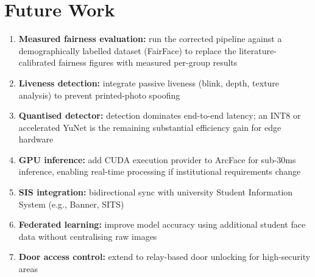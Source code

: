 \documentclass[12pt,a4paper]{report}
\begin{document}
\section{Future Work}
\begin{enumerate}
  \item \textbf{Measured fairness evaluation:} run the corrected pipeline against a
        demographically labelled dataset (FairFace) to replace the
        literature-calibrated fairness figures with measured per-group results
  \item \textbf{Liveness detection:} integrate passive liveness (blink, depth, texture analysis) to prevent printed-photo spoofing
  \item \textbf{Quantised detector:} detection dominates end-to-end latency; an INT8 or accelerated YuNet is the remaining substantial efficiency gain for edge hardware
  \item \textbf{GPU inference:} add CUDA execution provider to ArcFace for sub-30ms inference, enabling real-time processing if institutional requirements change
  \item \textbf{SIS integration:} bidirectional sync with university Student Information System (e.g., Banner, SITS)
  \item \textbf{Federated learning:} improve model accuracy using additional student face data without centralising raw images
  \item \textbf{Door access control:} extend to relay-based door unlocking for high-security areas
\end{enumerate}
\end{document}
